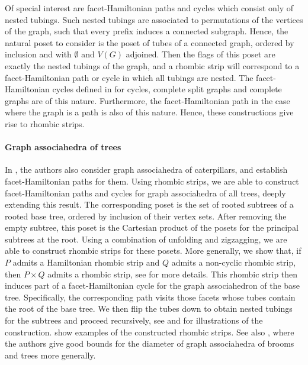 \documentclass[fontsize=11pt,a4paper,DIV=12]{scrartcl}
\begin{document}
Of special interest are facet-Hamiltonian paths and cycles which consist only of nested tubings. Such nested tubings are associated to permutations of the vertices of the graph, such that every prefix induces a connected subgraph. Hence, the natural poset to consider is the poset of tubes of a connected graph, ordered by inclusion and with $\emptyset$ and $V(G)$ adjoined. Then the flags of this poset are exactly the nested tubings of the graph, and a rhombic strip will correspond to a facet-Hamiltonian path or cycle in which all tubings are nested. The facet-Hamiltonian cycles defined in \cite{facethamiltonicity} for cycles, complete split graphs and complete graphs are of this nature. Furthermore, the facet-Hamiltonian path in the case where the graph is a path is also of this nature. Hence, these constructions give rise to rhombic strips.

\paragraph{Graph associahedra of trees}
In \cite{facethamiltonicity}, the authors also consider graph associahedra of caterpillars, and establish facet-Hamiltonian paths for them. Using rhombic strips, we are able to construct facet-Hamiltonian paths and cycles for graph associahedra of all trees, deeply extending this result. The corresponding poset is the set of rooted subtrees of a rooted base tree, ordered by inclusion of their vertex sets. After removing the empty subtree, this poset is the Cartesian product of the posets for the principal subtrees at the root. Using a combination of unfolding and zigzagging, we are able to construct rhombic strips for these posets. More generally, we show that, if $P$ admits a Hamiltonian rhombic strip and $Q$ admits a non-cyclic rhombic strip, then $P\times Q$ admits a rhombic strip, see  for more details. This rhombic strip then induces part of a facet-Hamiltonian cycle for the graph associahedron of the base tree. Specifically, the corresponding path visits those facets whose tubes contain the root of the base tree. We then flip the tubes down to obtain nested tubings for the subtrees and proceed recursively, see  and  for illustrations of the construction.  show examples of the constructed rhombic strips. See also \cite{Broom_associahedra_diameter, Tree_associahedra_diameter}, where the authors give good bounds for the diameter of graph associahedra of brooms and trees more generally.
\end{document}
